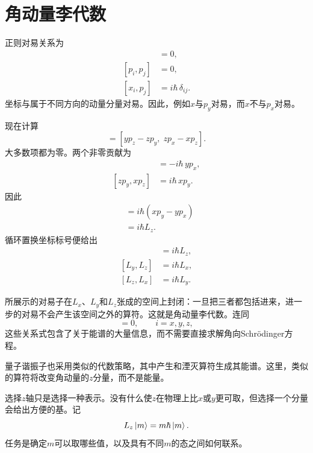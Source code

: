\section{角动量李代数}

正则对易关系为
\begin{align}
[x_i,x_j]&=0,\\
[p_i,p_j]&=0,\\
[x_i,p_j]&=i\hbar\,\delta_{ij}.
\end{align}
坐标与属于不同方向的动量分量对易。因此，例如\(x\)与\(p_y\)对易，而\(x\)不与\(p_x\)对易。

现在计算
\begin{equation}
[L_x,L_y]
=
[yp_z-zp_y,\;zp_x-xp_z].
\end{equation}
大多数项都为零。两个非零贡献为
\begin{align}
[yp_z,zp_x]&=-i\hbar\,yp_x,\\
[zp_y,xp_z]&=i\hbar\,xp_y.
\end{align}
因此
\begin{align}
[L_x,L_y]
&=i\hbar\left(xp_y-yp_x\right)\\
&=i\hbar L_z.
\end{align}
循环置换坐标标号便给出
\begin{align}
[L_x,L_y]&=i\hbar L_z,\\
[L_y,L_z]&=i\hbar L_x,\\
[L_z,L_x]&=i\hbar L_y.
\end{align}

\begin{classroomqa}
\end{classroomqa}

所展示的对易子在\(L_x\)、\(L_y\)和\(L_z\)张成的空间上封闭：一旦把三者都包括进来，进一步的对易不会产生该空间之外的算符。这就是角动量李代数。连同
\begin{equation}
[H,L_i]=0,
\qquad i=x,y,z,
\end{equation}
这些关系式包含了关于能谱的大量信息，而不需要直接求解角向Schr\"odinger方程。

量子谐振子也采用类似的代数策略，其中产生和湮灭算符生成其能谱。这里，类似的算符将改变角动量的\(z\)分量，而不是能量。

选择\(z\)轴只是选择一种表示。没有什么使\(z\)在物理上比\(x\)或\(y\)更可取，但选择一个分量会给出方便的基。记
\begin{equation}
L_z\left\lvert m\right\rangle=m\hbar\left\lvert m\right\rangle.
\end{equation}
任务是确定\(m\)可以取哪些值，以及具有不同\(m\)的态之间如何联系。


